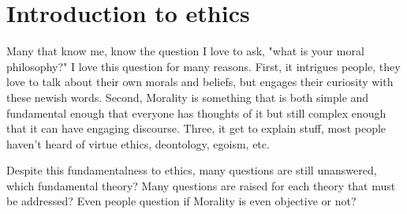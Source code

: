 \section{Introduction to ethics}
\par Many that know me, know the question I love to ask, "what is your moral philosophy?" I love this question for many reasons. First, it intrigues people, they love to talk about their own morals and beliefs, but engages their curiosity with these newish words. Second, Morality is something that is both simple and fundamental enough that everyone has thoughts of it but still complex enough that it can have engaging discourse. Three, it get to explain stuff, most people haven't heard of virtue ethics, deontology, egoism, etc.

\par Despite this fundamentalness to ethics, many questions are still unanswered, which fundamental theory? Many questions are raised for each theory that must be addressed? Even people question if Morality is even objective or not? 
